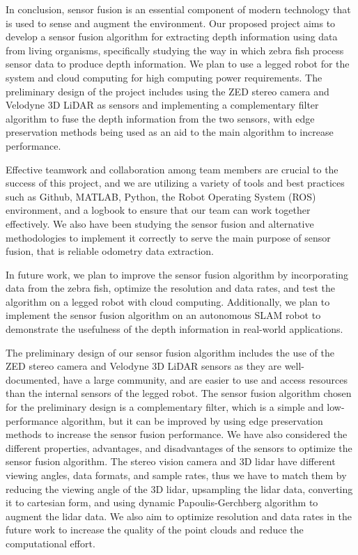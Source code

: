 \documentclass[12pt]{article}
\begin{document}
In conclusion, sensor fusion is an essential component of modern technology that is used to sense and augment the environment. Our proposed project aims to develop a sensor fusion algorithm for extracting depth information using data from living organisms, specifically studying the way in which zebra fish process sensor data to produce depth information. We plan to use a legged robot for the system and cloud computing for high computing power requirements. The preliminary design of the project includes using the ZED stereo camera and Velodyne 3D LiDAR as sensors and implementing a complementary filter algorithm to fuse the depth information from the two sensors, with edge preservation methods being used as an aid to the main algorithm to increase performance.

Effective teamwork and collaboration among team members are crucial to the success of this project, and we are utilizing a variety of tools and best practices such as Github, MATLAB, Python, the Robot Operating System (ROS) environment, and a logbook to ensure that our team can work together effectively. We also have been studying the sensor fusion and alternative methodologies to implement it correctly to serve the main purpose of sensor fusion, that is reliable odometry data extraction.

In future work, we plan to improve the sensor fusion algorithm by incorporating data from the zebra fish, optimize the resolution and data rates, and test the algorithm on a legged robot with cloud computing. Additionally, we plan to implement the sensor fusion algorithm on an autonomous SLAM robot to demonstrate the usefulness of the depth information in real-world applications.

The preliminary design of our sensor fusion algorithm includes the use of the ZED stereo camera and Velodyne 3D LiDAR sensors as they are well-documented, have a large community, and are easier to use and access resources than the internal sensors of the legged robot. The sensor fusion algorithm chosen for the preliminary design is a complementary filter, which is a simple and low-performance algorithm, but it can be improved by using edge preservation methods to increase the sensor fusion performance. We have also considered the different properties, advantages, and disadvantages of the sensors to optimize the sensor fusion algorithm. The stereo vision camera and 3D lidar have different viewing angles, data formats, and sample rates, thus we have to match them by reducing the viewing angle of the 3D lidar, upsampling the lidar data, converting it to cartesian form, and using dynamic Papoulis-Gerchberg algorithm to augment the lidar data. We also aim to optimize resolution and data rates in the future work to increase the quality of the point clouds and reduce the computational effort.
\end{document}
